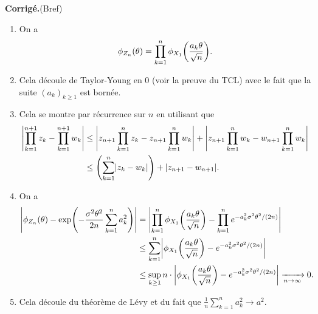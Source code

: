 \documentclass[a4paper,11pt]{article}
\let\originalleft\left
\let\originalright\right
\renewcommand{\left}{\mathopen{}\mathclose\bgroup\originalleft}
\renewcommand{\right}{\aftergroup\egroup\originalright}
\newcommand{\1}{\mathbbm{1}}
\newcommand{\abs}[1]{\left\lvert#1\right\rvert}
\theoremstyle{plain}
\theoremstyle{definition}
\renewenvironment{comment}{\medskip\noindent \textcolor{BrickRed}{\textbf{Corrigé.}}}{}
\begin{document}
\begin{comment}(Bref)
\begin{enumerate}
	\item On a 
	\[
	\phi_{Z_n}(\theta) 
	= \prod_{k=1}^n \phi_{X_1}\left( \frac{a_k \theta}{\sqrt{n}} \right).
	\]
	\item Cela découle de Taylor-Young en 0 (voir la preuve du TCL) avec le fait que la suite $(a_k)_{k\geq 1}$ est bornée.
	\item Cela se montre par récurrence sur $n$ en utilisant que 
	\begin{align*}
	\abs{\prod_{k=1}^{n+1} z_k - \prod_{k=1}^{n+1} w_k}
	& \leq \abs{z_{n+1} \prod_{k=1}^n z_k - z_{n+1} \prod_{k=1}^n w_k} + \abs{z_{n+1} \prod_{k=1}^n w_k - w_{n+1} \prod_{k=1}^n w_k} \\
	& \leq \left( \sum_{k=1}^n \abs{z_k - w_k} \right) + \abs{z_{n+1}-w_{n+1}}.
	\end{align*}
	\item On a
	\begin{align*}
	\abs{\phi_{Z_n}(\theta) 
		- \exp\left( - \frac{\sigma^2\theta^2}{2n} \sum_{k=1}^n a_k^2 \right)}
	& = \abs{\prod_{k=1}^n \phi_{X_1}\left( \frac{a_k \theta}{\sqrt{n}} \right) 
		- \prod_{k=1}^n e^{-a_k^2 \sigma^2 \theta^2 /(2n)} } \\
	& \leq \sum_{k=1}^n \abs{ \phi_{X_1}\left( \frac{a_k \theta}{\sqrt{n}} \right) 
		- e^{-a_k^2 \sigma^2 \theta^2 /(2n)} } \\
	& \leq \sup_{k \geq 1} n \cdot
	\abs{\phi_{X_1} \left( \frac{a_k \theta}{\sqrt{n}} \right) 
		- e^{-a_k^2 \sigma^2 \theta^2 /(2n)} }
	\xrightarrow[n\to\infty]{} 0.
	\end{align*}
	\item Cela découle du théorème de Lévy et du fait que $\frac{1}{n} \sum_{k=1}^n a_k^2 \to a^2$.
\end{enumerate}
\end{comment}
\end{document}
